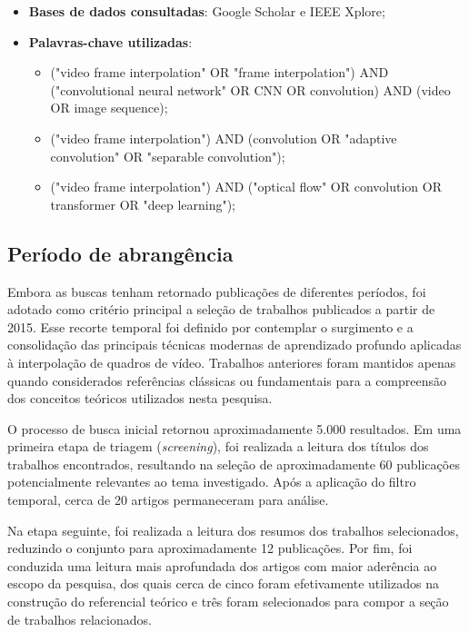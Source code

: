 \documentclass[
    12pt,                %
    openright,           %
    oneside,             %
    a4paper,             %
    english,             %
    brazil               %
]{abntex2}
\begin{document}
\begin{itemize}
    \item \textbf{Bases de dados consultadas}: Google Scholar e IEEE Xplore;

    \item \textbf{Palavras-chave utilizadas}:
    \begin{itemize}
        \item ("video frame interpolation" OR "frame interpolation") AND ("convolutional neural network" OR CNN OR convolution) AND (video OR image sequence);
        \item ("video frame interpolation") AND (convolution OR "adaptive convolution" OR "separable convolution");
        \item ("video frame interpolation") AND ("optical flow" OR convolution OR transformer OR "deep learning");
    \end{itemize}
\end{itemize}

\subsection{Período de abrangência}

Embora as buscas tenham retornado publicações de diferentes períodos, foi adotado como critério principal a seleção de trabalhos publicados a partir de 2015. Esse recorte temporal foi definido por contemplar o surgimento e a consolidação das principais técnicas modernas de aprendizado profundo aplicadas à interpolação de quadros de vídeo. Trabalhos anteriores foram mantidos apenas quando considerados referências clássicas ou fundamentais para a compreensão dos conceitos teóricos utilizados nesta pesquisa.

O processo de busca inicial retornou aproximadamente 5.000 resultados. Em uma primeira etapa de triagem (\textit{screening}), foi realizada a leitura dos títulos dos trabalhos encontrados, resultando na seleção de aproximadamente 60 publicações potencialmente relevantes ao tema investigado. Após a aplicação do filtro temporal, cerca de 20 artigos permaneceram para análise.

Na etapa seguinte, foi realizada a leitura dos resumos dos trabalhos selecionados, reduzindo o conjunto para aproximadamente 12 publicações. Por fim, foi conduzida uma leitura mais aprofundada dos artigos com maior aderência ao escopo da pesquisa, dos quais cerca de cinco foram efetivamente utilizados na construção do referencial teórico e três foram selecionados para compor a seção de trabalhos relacionados.
\end{document}
